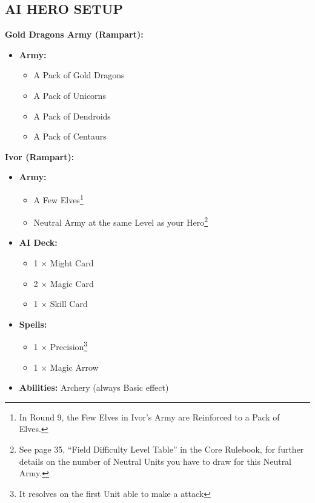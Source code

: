 \begin{multicols*}{2}
\subsection*{\MakeUppercase{AI Hero Setup}}

\textbf{Gold Dragons Army (Rampart):}
\begin{itemize}
  \item \textbf{Army:}
    \begin{itemize}
      \item A Pack of Gold Dragons
      \item A Pack of Unicorns
      \item A Pack of Dendroids
      \item A Pack of Centaurs
    \end{itemize}
\end{itemize}

\textbf{Ivor (Rampart):}
\begin{itemize}
  \item \textbf{Army:}
    \begin{itemize}
      \item A Few Elves\footnote{In Round 9, the Few Elves in Ivor's Army are Reinforced to a Pack of Elves.}
      \item Neutral Army at the same Level as your Hero\footnote{See page 35, ``Field Difficulty Level Table'' in the Core Rulebook, for further details on the number of Neutral Units you have to draw for this Neutral Army.}
    \end{itemize}
  \item \textbf{AI Deck:}
    \begin{itemize}
      \item 1 × Might  Card
      \item 2 × Magic  Card
      \item 1 × Skill  Card
    \end{itemize}
  \item \textbf{Spells:}
    \begin{itemize}
      \item 1 × Precision\footnote{It resolves on the first  Unit able to make a  attack}
      \item 1 × Magic Arrow
    \end{itemize}
  \item \textbf{Abilities:} Archery (always Basic effect)
\end{itemize}


\end{multicols*}
